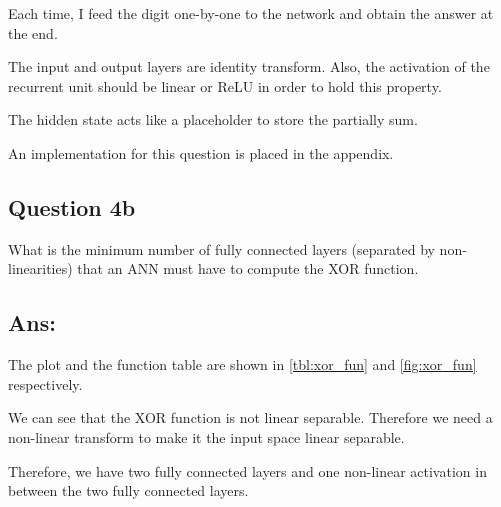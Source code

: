 \documentclass{kthreport}
\begin{document}
Each time, I feed the digit one-by-one to the network and obtain the answer at the end.

The input and output layers are identity transform.
Also, the activation of the recurrent unit should be linear or ReLU in order to hold
this property.

The hidden state acts like a placeholder to store the partially sum.

An implementation for this question is placed in the appendix.

\subsection{Question 4b}
What is the minimum number of fully connected layers (separated by non-linearities)
that an ANN must have to compute the XOR function.

\subsection*{Ans:}
The plot and the function table are shown in \cref{tbl:xor_fun} and \cref{fig:xor_fun}
respectively.

We can see that the XOR function is not linear separable. Therefore we need a non-linear
transform to make it the input space linear separable.

Therefore, we have two fully connected layers and one non-linear activation in between
the two fully connected layers.
\end{document}
